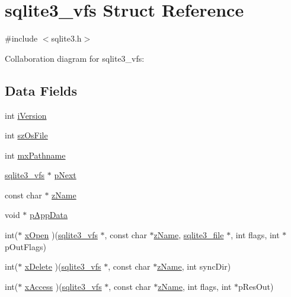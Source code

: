 \hypertarget{structsqlite3__vfs}{}\section{sqlite3\+\_\+vfs Struct Reference}
\label{structsqlite3__vfs}


{\ttfamily \#include $<$sqlite3.\+h$>$}



Collaboration diagram for sqlite3\+\_\+vfs\+:
\subsection*{Data Fields}
\begin{DoxyCompactItemize}
\item 
int \hyperlink{structsqlite3__vfs_a1138620d71393e6105389670719d9685}{i\+Version}
\item 
int \hyperlink{structsqlite3__vfs_a96670e11731f3227851f651b807a63c8}{sz\+Os\+File}
\item 
int \hyperlink{structsqlite3__vfs_a04df9f08eb19e4567ea3899f8a938d5c}{mx\+Pathname}
\item 
\hyperlink{structsqlite3__vfs}{sqlite3\+\_\+vfs} $\ast$ \hyperlink{structsqlite3__vfs_abc186adb2e4e9a305637954666a1c970}{p\+Next}
\item 
const char $\ast$ \hyperlink{structsqlite3__vfs_a58125535bc4b42100276f9f3390ffae0}{z\+Name}
\item 
void $\ast$ \hyperlink{structsqlite3__vfs_a2edf2e7445f2f46196126195c7710f75}{p\+App\+Data}
\item 
int($\ast$ \hyperlink{structsqlite3__vfs_a6cc44918b6646d3b005b0b04c01e3fe5}{x\+Open} )(\hyperlink{structsqlite3__vfs}{sqlite3\+\_\+vfs} $\ast$, const char $\ast$\hyperlink{structsqlite3__vfs_a58125535bc4b42100276f9f3390ffae0}{z\+Name}, \hyperlink{structsqlite3__file}{sqlite3\+\_\+file} $\ast$, int flags, int $\ast$p\+Out\+Flags)
\item 
int($\ast$ \hyperlink{structsqlite3__vfs_a912173a4206a6fb4d7ae9e76420a8596}{x\+Delete} )(\hyperlink{structsqlite3__vfs}{sqlite3\+\_\+vfs} $\ast$, const char $\ast$\hyperlink{structsqlite3__vfs_a58125535bc4b42100276f9f3390ffae0}{z\+Name}, int sync\+Dir)
\item 
int($\ast$ \hyperlink{structsqlite3__vfs_abc25aba7356d962a9602b37f3b769001}{x\+Access} )(\hyperlink{structsqlite3__vfs}{sqlite3\+\_\+vfs} $\ast$, const char $\ast$\hyperlink{structsqlite3__vfs_a58125535bc4b42100276f9f3390ffae0}{z\+Name}, int flags, int $\ast$p\+Res\+Out)

\end{DoxyCompactItemize}
